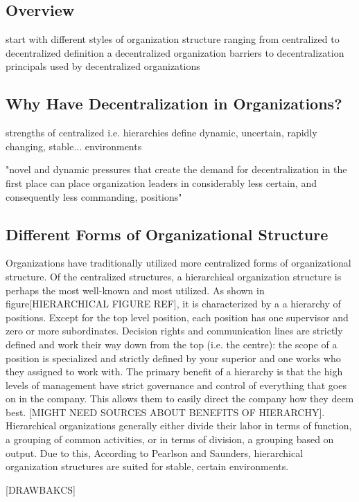 \subsection{Overview}
start with different styles of organization structure ranging from centralized to decentralized
definition a decentralized organization
barriers to decentralization
principals used by decentralized organizations


\subsection{Why Have Decentralization in Organizations?}
strengths of centralized i.e. hierarchies
define dynamic, uncertain, rapidly changing, stable... environments

"novel and dynamic pressures that create the demand for decentralization in the first place can place organization leaders in considerably less certain, and consequently less commanding, positions"

\subsection{Different Forms of Organizational Structure}
\label{org:form}

Organizations have traditionally utilized more centralized forms of organizational structure. Of the centralized structures, a hierarchical organization structure is perhaps the most well-known and most utilized. As shown in figure[HIERARCHICAL FIGURE REF], it is characterized by a a hierarchy of positions. Except for the top level position, each position has one supervisor and zero or more subordinates. Decision rights and communication lines are strictly defined and work their way down from the top (i.e. the centre): the scope of a position is specialized and strictly defined by your superior and one works who they assigned to work with. The primary benefit of a hierarchy is that the high levels of management have strict governance and control of everything that goes on in the company. This allows them to easily direct the company how they deem best. [MIGHT NEED SOURCES ABOUT BENEFITS OF HIERARCHY]. Hierarchical organizations generally either divide their labor in terms of function, a grouping of common activities, or in terms of division, a grouping based on output. Due to this, According to Pearlson and Saunders, hierarchical organization structures are suited for stable, certain environments. ~\cite{pearlson2009}

[DRAWBAKCS]

